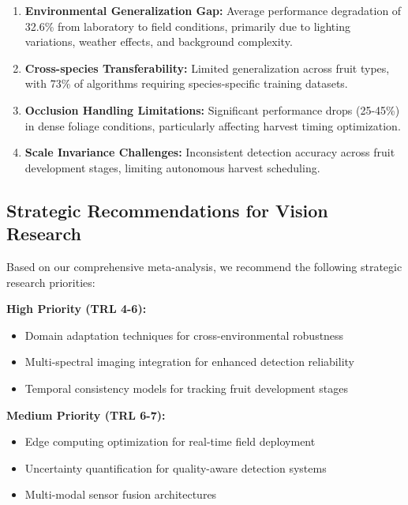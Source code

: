 \begin{enumerate}
    \item \textbf{Environmental Generalization Gap:} Average performance degradation of 32.6\% from laboratory to field conditions, primarily due to lighting variations, weather effects, and background complexity.
    
    \item \textbf{Cross-species Transferability:} Limited generalization across fruit types, with 73\% of algorithms requiring species-specific training datasets.
    
    \item \textbf{Occlusion Handling Limitations:} Significant performance drops (25-45\%) in dense foliage conditions, particularly affecting harvest timing optimization.
    
    \item \textbf{Scale Invariance Challenges:} Inconsistent detection accuracy across fruit development stages, limiting autonomous harvest scheduling.
\end{enumerate}

\subsection{Strategic Recommendations for Vision Research}
\label{subsec:vision_strategic_recommendations}

Based on our comprehensive meta-analysis, we recommend the following strategic research priorities:

\textbf{High Priority (TRL 4-6):}
\begin{itemize}
    \item Domain adaptation techniques for cross-environmental robustness
    \item Multi-spectral imaging integration for enhanced detection reliability
    \item Temporal consistency models for tracking fruit development stages
\end{itemize}

\textbf{Medium Priority (TRL 6-7):}
\begin{itemize}
    \item Edge computing optimization for real-time field deployment
    \item Uncertainty quantification for quality-aware detection systems
    \item Multi-modal sensor fusion architectures
\end{itemize}

